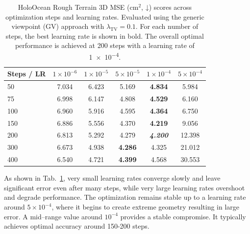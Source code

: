 \begin{table}[h]
  \centering
  \captionsetup{width=0.85\linewidth}
  \caption{\centering
    HoloOcean Rough Terrain 3D MSE (cm$^2$, ↓) scores across optimization steps and learning rates.
    Evaluated using the generic viewpoint (GV) approach with \(\lambda_\text{TV}=0.1\).
    For each number of steps, the best learning rate is shown in bold. The overall optimal performance is achieved at 200 steps with a learning rate of \num{1e-4}.
  }
  \label{tab:steps_lr_ablation_mse}
  \begin{tabular}{@{}lccccc@{}}
    \toprule
    Steps / LR &
    $1\times10^{-6}$ &
    $1\times10^{-5}$ &
    $5\times10^{-5}$ &
    $1\times10^{-4}$ &
    $5\times10^{-4}$ \\
    \midrule
    50  & 7.034 & 6.423 & 5.169 & \textbf{4.834} & 5.984 \\ %
    75  & 6.998 & 6.147 & 4.808 & \textbf{4.529} & 6.160 \\ %
    100 & 6.960 & 5.916 & 4.595 & \textbf{4.364} & 6.750 \\ %
    150 & 6.886 & 5.556 & 4.370 & \textbf{4.219} & 9.056 \\ %
    200 & 6.813 & 5.292 & 4.279 & \textit{\textbf{4.200}} & 12.398 \\ %
    300 & 6.673 & 4.938 & \textbf{4.286} & 4.325 & 21.012 \\ %
    400 & 6.540 & 4.721 & \textbf{4.399} & 4.568 & 30.553 \\ %
    \bottomrule
  \end{tabular}
\end{table}

As shown in Tab.~\ref{tab:steps_lr_ablation_mse}, very small learning rates converge slowly and leave significant error even after many steps, while very large learning rates overshoot and degrade performance. The optimization remains stable up to a learning rate around \(5\times10^{-4}\), where it begins to create extreme geometry resulting in large error. A mid–range value around \(10^{-4}\) provides a stable compromise. It typically achieves optimal accuracy around \num{150}-\num{200} steps.

